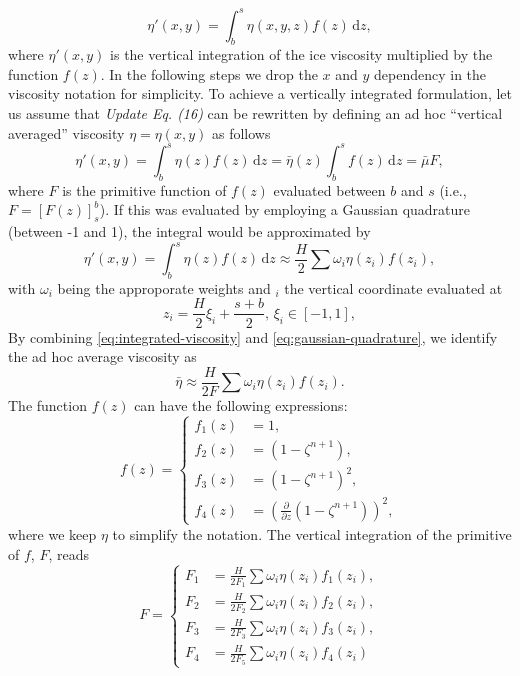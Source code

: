 \documentclass{amsart}
\begin{document}
\begin{equation}
\eta'(x,y) = \int_b^s \eta(x,y,z) f(z)\,\mathrm{d}z,
\end{equation}
where $\eta'(x,y)$ is the vertical integration of the ice viscosity multiplied by the function $f(z)$. In the following steps we drop the $x$ and $y$ dependency in the viscosity notation for simplicity. To achieve a vertically integrated formulation, let us assume that \emph{Update Eq. (16)} can be rewritten by defining an ad hoc “vertical averaged” viscosity
$\eta=\eta(x,y)$ as follows
\begin{equation}
  \label{eq:integrated-viscosity}
\eta'(x,y) = \int_b^s \eta(z) f(z)\,\mathrm{d}z = \bar \eta(z) \int_b^s f(z)\,\mathrm{d}z = \bar \mu F,
\end{equation}
where $F$ is the primitive function of $f(z)$ evaluated between $b$ and $s$ (i.e., $F =[F(z)]_s^b$). If this was evaluated by employing a Gaussian quadrature (between -1 and 1), the integral would be approximated by
\begin{equation}
  \label{eq:gaussian-quadrature}
\eta'(x,y) = \int_b^s \eta(z) f(z)\,\mathrm{d}z \approx \frac{H}{2} \sum \omega_i \eta(z_i) f(z_i),
\end{equation}
with $\omega_i$ being the approporate weights and $_i$ the vertical coordinate evaluated at
\begin{equation}
z_i = \frac{H}{2} \xi_i + \frac{s+b}{2},\, \xi_i \in [-1,1],
\end{equation}
By combining \eqref{eq:integrated-viscosity} and \eqref{eq:gaussian-quadrature}, we identify the ad hoc average viscosity as
\begin{equation}
\bar \eta \approx \frac{H}{2F}  \sum \omega_i \eta(z_i) f(z_i).
\end{equation}
The function $f(z)$ can have the following expressions:
\begin{equation}
  f(z) = \left\{
  \begin{array}{rl}
    f_1(z) & =  1, \\
    f_2(z) & =  (1-\zeta^{n+1}), \\
    f_3(z) & = (1-\zeta^{n+1})^2, \\
    f_4(z) & =  \left(\frac{\partial}{\partial z}\left(1-\zeta^{n+1}\right)\right)^2,
  \end{array} \right.
\end{equation}
where we keep $\eta$  to simplify the notation. The vertical integration of the primitive of $f$, $F$, reads
\begin{equation}
  F = \left\{
  \begin{array}{rl}
    F_1 & =   \frac{H}{2F_1}  \sum \omega_i \eta(z_i) f_1(z_i), \\
    F_2 & =   \frac{H}{2F_2}  \sum \omega_i \eta(z_i) f_2(z_i), \\
    F_3 & =   \frac{H}{2F_3}  \sum \omega_i \eta(z_i) f_3(z_i), \\
    F_4 & =   \frac{H}{2F_5}  \sum \omega_i \eta(z_i) f_4(z_i)
  \end{array} \right.
\end{equation}
\end{document}
